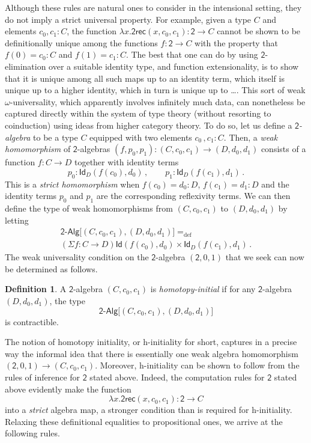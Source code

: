 \documentclass{article}
\newcommand{\defeq}{=_{\mathrm{def}}}
\newcommand{\Id}{\mathsf{Id}}
\newcommand{\id}[1]{\Id_{#1}}
\newcommand{\Bool}{\mathsf{2}}
\newcommand{\boolrec}{\mathsf{2rec}}
\newcommand{\BoolAlg}{\mathsf{2}\text{-}\mathsf{Alg}}
\theoremstyle{remark}
\theoremstyle{definition}
\newtheorem{definition}[theorem]{Definition}
\begin{document}
Although these rules are natural ones to consider in the intensional setting, they do not imply a strict universal property. For example, given a type $C$ and elements $c_0, c_1 : 
C$, the function $\lambda x . \boolrec(x, c_0,c_1) : \Bool \rightarrow C$ cannot  be shown to be definitionally unique among the functions $f :  
\Bool \rightarrow C$ with the property that $f(0)=c_0 : C$ and $f(1)=c_1 : C$.  
The best that one can do by using $\Bool$-elimination over a suitable identity type, and function extensionality, is to show that it is unique among all such maps up to an identity term, which itself is unique up to a higher identity, which in turn is unique up to \ldots. This sort of weak $\omega$-universality, which apparently involves infinitely much data, can nonetheless be captured directly within the system of type theory (without resorting to coinduction) using ideas from higher category theory. To do so, let us define a \emph{$\Bool$-algebra} to be a type $C$ equipped with two elements
$c_0 \, , c_1 : C$. Then, a \emph{weak homomorphism} of $\Bool$-algebras
$(f, p_0, p_1) : (C, c_0,c_1)\rightarrow (D,d_0,d_1)$  
consists of a  function $f : C\rightarrow D$ together with identity terms 
\[
p_0 :  \id{D}(f (c_0) ,d_0) \, , \qquad p_1 :   \id{D}(f (c_1), d_1) \, .
\]
This is a \emph{strict homomorphism} when $f (c_0) = d_0 : D$, $f (c_1) = d_1 : D $ and the identity terms $p_0$ and $p_1$ are the corresponding reflexivity terms.  We can then define the type of weak homomorphisms from $(C, c_0,c_1)$ to $(D,d_0,d_1)$ by letting
\begin{multline*}
\BoolAlg [ (C, c_0,c_1), (D,d_0,d_1) \big] \defeq \\
 (\Sigma f: C \rightarrow D) \Id(f (c_0), d_0) \times\id{D}(f (c_1), d_1) \, .
\end{multline*}
The weak universality condition on the $\Bool$-algebra $(\Bool, 0, 1)$ that we seek can now be determined as follows. 

\begin{definition} \label{thm:boolhinitial}
A $\Bool$-algebra $(C, c_0,c_1)$ is \emph{homotopy-initial} if for any $\Bool$-algebra $(D,d_0,d_1)$, the type 
\[
\BoolAlg \big[ (C, c_0,c_1), (D,d_0,d_1)\big]
\] 
is contractible.
\end{definition}

\noindent The notion of homotopy initiality, or h-initiality for short, captures in a precise way the informal idea that there is essentially one weak algebra homomorphism $(\Bool, 0, 1) \rightarrow (C,c_0,c_1)$.  Moreover, h-initiality can be shown to follow from the rules of inference for $\Bool$ stated above.  Indeed, the  computation rules for $\Bool$ stated above
 evidently make the function
\[
\lambda x . \boolrec(x, c_0,c_1) : \Bool \rightarrow C
\]
into a \emph{strict} algebra map, a stronger condition than is required for h-initiality.  Relaxing these 
definitional equalities to propositional ones, we arrive at the following rules.
\end{document}
